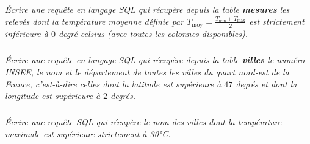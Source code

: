 \documentclass[10pt,fleqn]{article} %
\begin{document}
\ifprof
\begin{corrige}
\end{corrige}
\else
\fi
	
\subparagraph{} 	
\textit{ Écrire une requête en langage SQL qui récupère depuis la table 
	\textbf{mesures} les relevés dont la température moyenne définie par 
	$T_{\text{moy}}=\frac{T_{\text{min}}+T_{\text{max}}}{2}$ est strictement inférieure à $0$ degré celsius
		 (avec 	toutes les colonnes disponibles). }
		 
\ifprof
\begin{corrige}
\end{corrige}
\else
\fi
	
\subparagraph{} 
\textit{Écrire une requête en langage SQL qui récupère depuis la table 
	\textbf{villes} le numéro INSEE, le nom et le département de toutes les villes du quart 
	nord-est de la France, c'est-à-dire celles dont la latitude est supérieure 
	à $47$ degrés et dont la longitude est supérieure à $2$ degrés.}

\ifprof
\begin{corrige}
\end{corrige}
\else
\fi

\subparagraph{}
\textit{Écrire une requête SQL qui récupère le nom des villes dont la température maximale est supérieure strictement à 30°C.}

\ifprof
\begin{corrige}
\end{corrige}
\else
\fi
\end{document}
